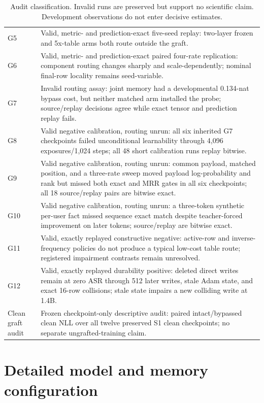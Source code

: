 \documentclass{article}
\begin{document}
\begin{table}[h]
\begin{tabularx}{\linewidth}{lX}
G5 & Valid, metric- and prediction-exact five-seed replay: two-layer frozen and 5x-table arms both route outside the graft. \\
G6 & Valid, metric- and prediction-exact paired four-rate replication: component routing changes sharply and scale-dependently; nominal final-row locality remains seed-variable. \\
G7 & Invalid routing assay: joint memory had a developmental 0.134-nat bypass cost, but neither matched arm installed the probe; source/replay decisions agree while exact tensor and prediction replay fails. \\
G8 & Valid negative calibration, routing unrun: all six inherited G7 checkpoints failed unconditional learnability through 4,096 exposures/1,024 steps; all 48 short calibration runs replay bitwise. \\
G9 & Valid negative calibration, routing unrun: common payload, matched position, and a three-rate sweep moved payload log-probability and rank but missed both exact and MRR gates in all six checkpoints; all 18 source/replay pairs are bitwise exact. \\
G10 & Valid negative calibration, routing unrun: a three-token synthetic per-user fact missed sequence exact match despite teacher-forced improvement on later tokens; source/replay are bitwise exact. \\
G11 & Valid, exactly replayed constructive negative: active-row and inverse-frequency policies do not produce a typical low-cost table route; registered impairment contrasts remain unresolved. \\
G12 & Valid, exactly replayed durability positive: deleted direct writes remain at zero ASR through 512 later writes, stale Adam state, and exact 16-row collisions; stale state impairs a new colliding write at 1.4B. \\
Clean graft audit & Frozen checkpoint-only descriptive audit: paired intact/bypassed clean NLL over all twelve preserved S1 clean checkpoints; no separate ungrafted-training claim. \\
\bottomrule
\end{tabularx}
\caption{Audit classification. Invalid runs are preserved but support no
scientific claim. Development observations do not enter decisive estimates.}
\label{tab:evidence}
\end{table}

\section{Detailed model and memory configuration}
\end{document}
